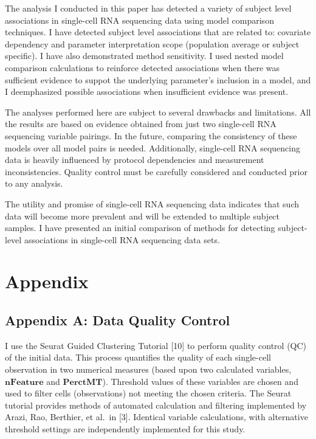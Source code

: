 \documentclass[12pt,]{article}
\begin{document}
The analysis I conducted in this paper has detected a variety of subject
level associations in single-cell RNA sequencing data using model
comparison techniques. I have detected subject level associations that
are related to: covariate dependency and parameter interpretation scope
(population average or subject specific). I have also demonstrated
method sensitivity. I used nested model comparison calculations to
reinforce detected associations when there was sufficient evidence to
suppot the underlying parameter's inclusion in a model, and I
deemphasized possible associations when insufficient evidence was
present.

The analyses performed here are subject to several drawbacks and
limitations. All the results are based on evidence obtained from just
two single-cell RNA sequencing variable pairings. In the future,
comparing the consistency of these models over all model pairs is
needed. Additionally, single-cell RNA sequencing data is heavily
influenced by protocol dependencies and measurement inconsistencies.
Quality control must be carefully considered and conducted prior to any
analysis.

The utility and promise of single-cell RNA sequencing data indicates
that such data will become more prevalent and will be extended to
multiple subject samples. I have presented an initial comparison of
methods for detecting subject-level associations in single-cell RNA
sequencing data sets.

\newpage

\hypertarget{appendix}{%
\section{Appendix}\label{appendix}}

\hypertarget{appendix-a-data-quality-control}{%
\subsection{Appendix A: Data Quality
Control}\label{appendix-a-data-quality-control}}

I use the Seurat Guided Clustering Tutorial {[}10{]} to perform quality
control (QC) of the initial data. This process quantifies the quality of
each single-cell observation in two numerical measures (based upon two
calculated variables, \(\mathbf{nFeature}\) and \(\mathbf{PerctMT}\)).
Threshold values of these variables are chosen and used to filter cells
(observations) not meeting the chosen criteria. The Seurat tutorial
provides methods of automated calculation and filtering implemented by
Arazi, Rao, Berthier, et al.~in {[}3{]}. Identical variable
calculations, with alternative threshold settings are independently
implemented for this study.
\end{document}
